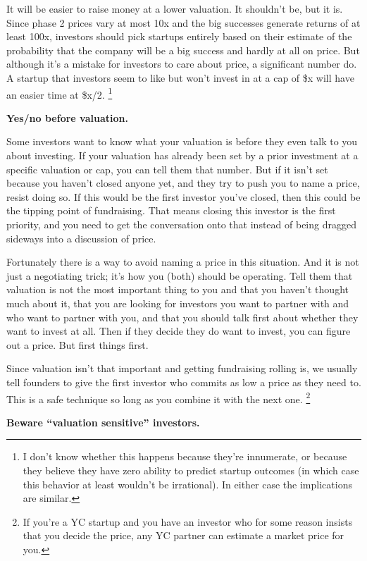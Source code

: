 It will be easier to raise money at a lower valuation. It shouldn't be,
but it is. Since phase 2 prices vary at most 10x and the big successes
generate returns of at least 100x, investors should pick startups
entirely based on their estimate of the probability that the company
will be a big success and hardly at all on price. But although it's a
mistake for investors to care about price, a significant number do. A
startup that investors seem to like but won't invest in at a cap of \$x
will have an easier time at \$x/2. \footnote{I don't know whether this happens because they're innumerate,
or because they believe they have zero ability to predict startup
outcomes (in which case this behavior at least wouldn't be irrational).
In either case the implications are similar.}

\textbf{Yes/no before valuation.}

Some investors want to know what your valuation is before they even talk
to you about investing. If your valuation has already been set by a
prior investment at a specific valuation or cap, you can tell them that
number. But if it isn't set because you haven't closed anyone yet, and
they try to push you to name a price, resist doing so. If this would be
the first investor you've closed, then this could be the tipping point
of fundraising. That means closing this investor is the first priority,
and you need to get the conversation onto that instead of being dragged
sideways into a discussion of price.

Fortunately there is a way to avoid naming a price in this situation.
And it is not just a negotiating trick; it's how you (both) should be
operating. Tell them that valuation is not the most important thing to
you and that you haven't thought much about it, that you are looking for
investors you want to partner with and who want to partner with you, and
that you should talk first about whether they want to invest at all.
Then if they decide they do want to invest, you can figure out a price.
But first things first.

Since valuation isn't that important and getting fundraising rolling is,
we usually tell founders to give the first investor who commits as low a
price as they need to. This is a safe technique so long as you combine
it with the next one. \footnote{If you're a YC startup and you have an investor who for some
reason insists that you decide the price, any YC partner can estimate a
market price for you.}

\textbf{Beware ``valuation sensitive'' investors.}

